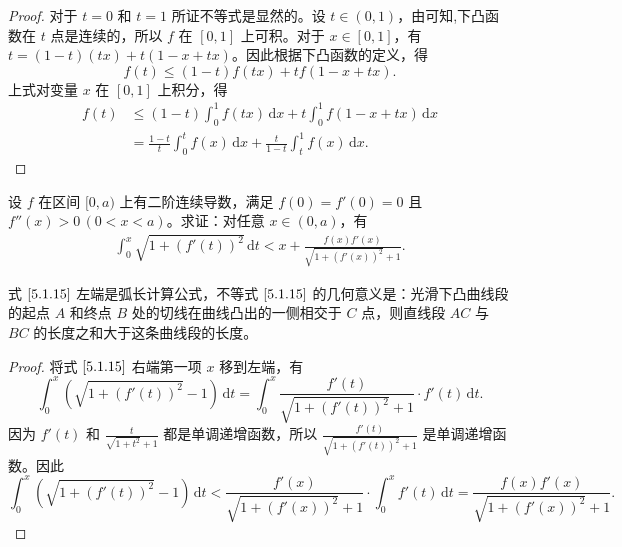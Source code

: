 \documentclass[../../main.tex]{subfiles}
\begin{document}
\begin{proof}
对于 \( t = 0 \) 和 \( t = 1 \) 所证不等式是显然的。设 \( t \in (0,1) \)，由可知,下凸函数在 \( t \) 点是连续的，所以 \( f \) 在 \([0,1]\) 上可积。对于 \( x \in [0,1] \)，有 \( t = (1 - t)(tx) + t(1 - x + tx) \)。因此根据下凸函数的定义，得
\[
f(t) \leqslant (1 - t)f(tx) + tf(1 - x + tx).
\]
上式对变量 \( x \) 在 \([0,1]\) 上积分，得
\begin{align*}
f(t) &\leqslant (1 - t) \int_{0}^{1} f(tx) \, \mathrm{d}x + t \int_{0}^{1} f(1 - x + tx) \, \mathrm{d}x
\\
&= \frac{1 - t}{t} \int_{0}^{t} f(x) \, \mathrm{d}x + \frac{t}{1 - t} \int_{t}^{1} f(x) \, \mathrm{d}x.
\end{align*}

\end{proof}

\begin{proposition}
设 \( f \) 在区间 \([0,a)\) 上有二阶连续导数，满足 \( f(0) = f'(0) = 0 \) 且 \( f''(x) > 0 \, (0 < x < a) \)。求证：对任意 \( x \in (0,a) \)，有
\begin{align}
\int_{0}^{x} \sqrt{1 + (f'(t))^2} \, \mathrm{d}t < x + \frac{f(x)f'(x)}{\sqrt{1 + (f'(x))^2} + 1}. \label{5.1.15}
\end{align}
\end{proposition}
\begin{remark}
式 \(\eqref{5.1.15}\) 左端是弧长计算公式，不等式 \(\eqref{5.1.15}\) 的几何意义是：光滑下凸曲线段的起点 \( A \) 和终点 \( B \) 处的切线在曲线凸出的一侧相交于 \( C \) 点，则直线段 \( AC \) 与 \( BC \) 的长度之和大于这条曲线段的长度。
\end{remark}
\begin{proof}
将式 \(\eqref{5.1.15}\) 右端第一项 \( x \) 移到左端，有
\[
\int_{0}^{x} \left( \sqrt{1 + (f'(t))^2} - 1 \right) \, \mathrm{d}t = \int_{0}^{x} \frac{f'(t)}{\sqrt{1 + (f'(t))^2} + 1} \cdot f'(t) \, \mathrm{d}t.
\]
因为 \( f'(t) \) 和 \( \frac{t}{\sqrt{1 + t^2} + 1} \) 都是单调递增函数，所以 \( \frac{f'(t)}{\sqrt{1 + (f'(t))^2} + 1} \) 是单调递增函数。因此
\[
\int_{0}^{x} \left( \sqrt{1 + (f'(t))^2} - 1 \right) \, \mathrm{d}t < \frac{f'(x)}{\sqrt{1 + (f'(x))^2} + 1} \cdot \int_{0}^{x} f'(t) \, \mathrm{d}t = \frac{f(x)f'(x)}{\sqrt{1 + (f'(x))^2} + 1}.
\]

\end{proof}
\end{document}
